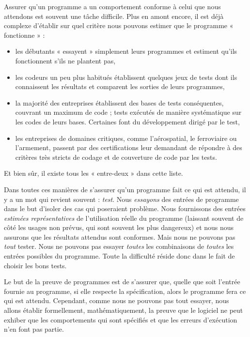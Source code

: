 

Assurer qu'un programme a un comportement conforme à celui que nous attendons
est souvent une tâche difficile. Plus en amont encore, il est déjà complexe 
d'établir sur quel critère nous pouvons estimer que le programme « fonctionne » :



\begin{itemize}
\item les débutants « essayent » simplement leurs programmes et estiment qu'ils 
fonctionnent s'ils ne plantent pas,
\item les codeurs un peu plus habitués établissent quelques jeux de tests dont ils
connaissent les résultats et comparent les sorties de leurs programmes,
\item la majorité des entreprises établissent des bases de tests conséquentes, 
couvrant un maximum de code ; tests exécutés de manière systématique sur les 
codes de leurs bases. Certaines font du développement dirigé par le test,
\item les entreprises de domaines critiques, comme l'aérospatial, le ferroviaire ou
l'armement, passent par des certifications leur demandant de répondre à des 
critères très stricts de codage et de couverture de code par les tests.
\end{itemize}


Et bien sûr, il existe tous les « entre-deux » dans cette liste.



Dans toutes ces manières de s'assurer qu'un programme fait ce qui est attendu, 
il y a un mot qui revient souvent : \textit{test}. Nous \textit{essayons} des entrées de 
programme dans le but d'isoler des cas qui poseraient problème. Nous fournissons
des entrées \textit{estimées représentatives} de l'utilisation réelle du programme
(laissant souvent de côté les usages non prévus, qui sont souvent les plus
dangereux) et 
nous nous assurons que les résultats attendus sont conformes. Mais nous ne 
pouvons pas \textit{tout} tester. Nous ne pouvons pas essayer \textit{toutes} les 
combinaisons de \textit{toutes} les entrées possibles du programme. Toute la 
difficulté réside donc dans le fait de choisir les bons tests.



Le but de la preuve de programmes est de s'assurer que, quelle que soit l'entrée
fournie au programme, si elle respecte la spécification, alors le programme 
fera ce qui est attendu. Cependant, comme nous ne pouvons pas tout essayer, nous 
allons établir formellement, mathématiquement, la preuve que le logiciel ne 
peut exhiber que les comportements qui sont spécifiés et que les erreurs 
d'exécution n'en font pas partie.



